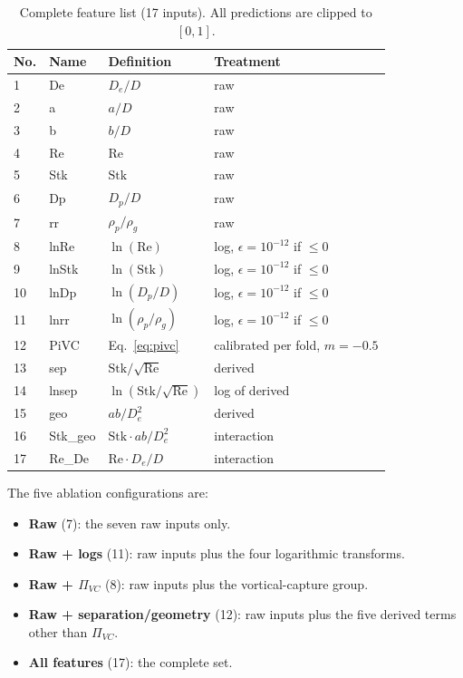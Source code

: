 \documentclass[12pt]{article}
\newcommand{\Stk}{\mathrm{Stk}}
\newcommand{\Rey}{\mathrm{Re}}
\newcommand{\PiVC}{\Pi_{VC}}
\begin{document}
\begin{table}[!ht]\centering
\caption{Complete feature list (17 inputs). All predictions are clipped to $[0,1]$.}
\label{tab:featurelist}\small
\begin{tabular}{llll}
\toprule
No. & Name & Definition & Treatment \\
\midrule
1 & De & $D_e/D$ & raw \\
2 & a & $a/D$ & raw \\
3 & b & $b/D$ & raw \\
4 & Re & $\Rey$ & raw \\
5 & Stk & $\Stk$ & raw \\
6 & Dp & $D_p/D$ & raw \\
7 & rr & $\rho_p/\rho_g$ & raw \\
\midrule
8 & lnRe & $\ln(\Rey)$ & log, $\epsilon=10^{-12}$ if $\leq0$ \\
9 & lnStk & $\ln(\Stk)$ & log, $\epsilon=10^{-12}$ if $\leq0$ \\
10 & lnDp & $\ln(D_p/D)$ & log, $\epsilon=10^{-12}$ if $\leq0$ \\
11 & lnrr & $\ln(\rho_p/\rho_g)$ & log, $\epsilon=10^{-12}$ if $\leq0$ \\
\midrule
12 & PiVC & Eq.~\eqref{eq:pivc} & calibrated per fold, $m=-0.5$ \\
13 & sep & $\Stk/\sqrt{\Rey}$ & derived \\
14 & lnsep & $\ln(\Stk/\sqrt{\Rey})$ & log of derived \\
15 & geo & $ab/D_e^2$ & derived \\
16 & Stk\_geo & $\Stk \cdot ab/D_e^2$ & interaction \\
17 & Re\_De & $\Rey \cdot D_e/D$ & interaction \\
\bottomrule
\end{tabular}
\end{table}

The five ablation configurations are:
\begin{itemize}[noitemsep]
\item \textbf{Raw} (7): the seven raw inputs only.
\item \textbf{Raw + logs} (11): raw inputs plus the four logarithmic transforms.
\item \textbf{Raw + $\PiVC$} (8): raw inputs plus the vortical-capture group.
\item \textbf{Raw + separation/geometry} (12): raw inputs plus the five derived terms other than $\PiVC$.
\item \textbf{All features} (17): the complete set.
\end{itemize}
\end{document}

